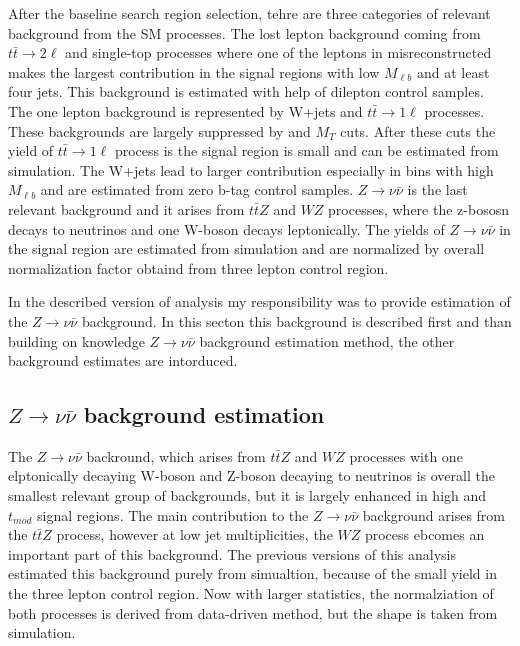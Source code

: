 After the baseline search region selection, tehre are three categories of relevant background from  the SM processes. The lost lepton background coming from $t\bar{t} \to 2 \ell$ and single-top processes where one of the leptons in misreconstructed makes the largest contribution in the signal regions with low $M_{\ell b}$ and at least four jets. This background is estimated with help of dilepton control samples. The one lepton background is represented by W+jets and $t\bar{t} \to 1\ell$ processes. These backgrounds are largely suppressed by \MET and $M_{T}$ cuts. After these cuts the yield of $t\bar{t} \to 1\ell$ process is the signal region is small and can be estimated from simulation. The W+jets lead to larger contribution especially in bins with high $M_{\ell b}$ and are estimated from zero b-tag control samples. $Z \to \nu \bar{\nu}$ is the last relevant background and it arises from $t\bar{t}Z$ and $WZ$ processes, where the z-bososn decays to neutrinos and one W-boson decays leptonically. The yields of $Z \to \nu \bar{\nu}$ in the signal region are estimated from simulation and are normalized by overall normalization factor obtaind from three lepton control region.  

In the described version of analysis my responsibility was to provide estimation of the $Z \to \nu \bar{\nu}$ background. In this secton this background is described first and than building on knowledge $Z \to \nu \bar{\nu}$ background estimation method, the other background estimates are intorduced.


\subsection{$Z \to \nu \bar{\nu}$ background estimation}

The $Z \to \nu \bar{\nu}$ backround, which arises from $t\bar{t}Z$ and $WZ$ processes with one elptonically decaying W-boson and Z-boson decaying to neutrinos is overall the smallest relevant group of backgrounds, but it is largely enhanced in high \MET and $t_{mod}$ signal regions. The main contribution to the $Z \to \nu \bar{\nu}$ background arises from  the $t\bar{t}Z$ process, however at low jet multiplicities, the $WZ$ process ebcomes an important part of this background.  The previous versions of this analysis estimated this background purely from simualtion, because of the small yield in the three lepton control region. Now with larger statistics, the normalziation of both processes is derived from data-driven method, but the shape is taken from simulation. 

